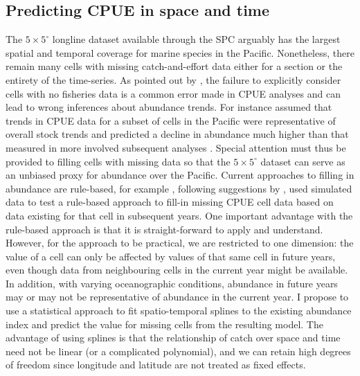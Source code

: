 \documentclass{article}
\newcommand{\griddef}[2]{$#1 \times #2^\circ$}
\begin{document}
\subsection{Predicting CPUE in space and time}
The \griddef{5}{5} longline dataset available through the SPC arguably
has the largest spatial and temporal coverage for marine
species in the Pacific. Nonetheless, there remain many cells with missing
catch-and-effort data either for a section or the entirety of the
time-series. As pointed out by \citet{Walters2003_a}, the
failure to explicitly consider cells with no fisheries data is a
common error made in CPUE analyses and can lead to wrong inferences
about abundance trends. For instance \citet{Myers2003_a} assumed that
trends in CPUE data for a subset of cells in the Pacific were
representative of overall stock trends and predicted a decline in abundance much
higher than that measured in more involved subsequent analyses
\citep{Sibert2006_a}. Special attention must thus be provided to
filling cells with missing data so that the \griddef{5}{5} dataset can serve
as an unbiased proxy for abundance over the Pacific. Current
approaches to filling in abundance are rule-based, for example
\citet{Carruthers2011_a}, following suggestions by
\citet{Walters2003_a}, used simulated data to test a rule-based
approach to fill-in missing CPUE cell data based on data
existing for that cell in subsequent years. One important advantage with
the rule-based approach is that it is straight-forward to apply and
understand. However, for the approach to be
practical, we are restricted to one dimension: the value of a cell can
only be affected by values of that same cell in future years, even
though data from neighbouring cells in the current year might be
available. In addition, with varying oceanographic conditions, abundance in future
years may or may not be representative of abundance in the current
year. I propose to use a statistical approach to fit spatio-temporal
splines to the existing abundance index and predict the value for
missing cells from the resulting model. The advantage of using splines
is that the relationship of catch over space and time need not be
linear (or a complicated polynomial), and we can retain high degrees
of freedom since longitude and latitude are not treated as fixed
effects. %

\end{document}
